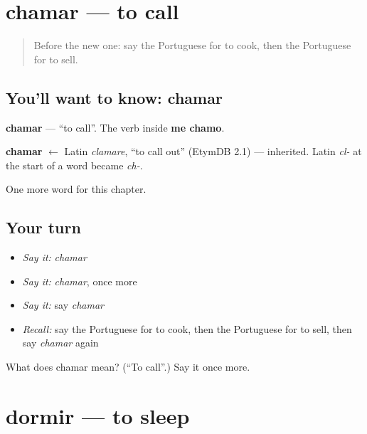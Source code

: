 \section[chamar]{chamar — to call}

\label{lesson:PT-C41-chamar}



\begin{quote}
Before the new one: say the Portuguese for to cook, then the Portuguese for to sell.
\end{quote}

\subsection*{You'll want to know: chamar}
\textbf{chamar} — \textquotedblleft{}to call\textquotedblright{}. The verb inside \textbf{me chamo}.

\begin{cousinweb}
\textbf{chamar} $\leftarrow$ Latin \emph{clamare}, \textquotedblleft{}to call out\textquotedblright{} (EtymDB 2.1) — inherited. Latin \emph{cl-} at the start of a word became \emph{ch-}.
\end{cousinweb}

\begin{grammarlens}[title={What you've built}]
One more word for this chapter.
\end{grammarlens}

\subsection*{Your turn}
\begin{itemize}
\raggedright
  \item \emph{Say it:} \emph{chamar}
  \item \emph{Say it:} \emph{chamar}, once more
  \item \emph{Say it:} say \emph{chamar}
  \item \emph{Recall:} say the Portuguese for to cook, then the Portuguese for to sell, then say \emph{chamar} again
\end{itemize}

\begin{tcolorbox}[breakable,colback=teal!4,colframe=teal!35!black,title={Before you move on}]
What does chamar mean? (\textquotedblleft{}To call\textquotedblright{}.) Say it once more.
\end{tcolorbox}
\section[dormir]{dormir — to sleep}

